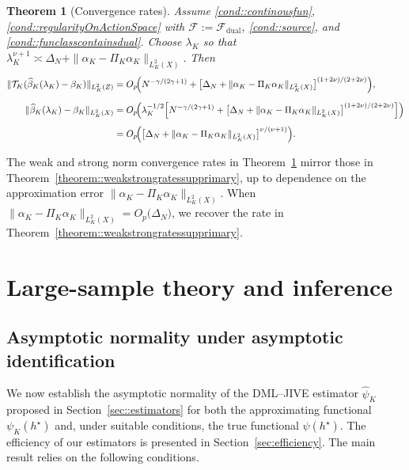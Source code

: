 \documentclass[11pt]{article}
\theoremstyle{plain}
\newtheorem{theorem}{Theorem}
\theoremstyle{definition}
\theoremstyle{remark}
\theoremstyle{definition}
\begin{document}
\begin{theorem}[Convergence rates]
\label{theorem::weakstrongratessup}
Assume \ref{cond::continousfun},  
\ref{cond::regularityOnActionSpace} with \(\mathcal{F} := \mathcal{F}_{\mathrm{dual}}\),  
\ref{cond::source}, and \ref{cond::funclasscontainsdual}.  
Choose \(\lambda_K\) so that $\lambda_K^{\nu+1} \asymp \Delta_N + \|\alpha_K - \Pi_K \alpha_K\|_{L^2_K(X)}.$
Then
\begin{align*}
\|\mathcal{T}_K(\widehat{\beta}_K(\lambda_K) - \beta_K)\|_{L^2_K(Z)}
&= O_p\!\Bigl(
N^{-\gamma/(2\gamma+1)}
+
\bigl[\Delta_N + \|\alpha_K - \Pi_K \alpha_K\|_{L^2_K(X)}\bigr]^{(1+2\nu)/(2+2\nu)}
\Bigr),\\[0.6em]
\|\widehat{\beta}_K(\lambda_K) - \beta_K\|_{L^2_K(X)}
&= O_p\!\Bigl(
\lambda_K^{-1/2}\Bigl[
N^{-\gamma/(2\gamma+1)}
+
\bigl[\Delta_N + \|\alpha_K - \Pi_K \alpha_K\|_{L^2_K(X)}\bigr]^{(1+2\nu)/(2+2\nu)}
\Bigr]\Bigr)\\[0.4em]
&= O_p\!\Bigl(
\bigl[\Delta_N + \|\alpha_K - \Pi_K \alpha_K\|_{L^2_K(X)}\bigr]^{\nu/(\nu+1)}
\Bigr).
\end{align*}
\end{theorem}


 
The weak and strong norm convergence rates in Theorem~\ref{theorem::weakstrongratessup} mirror those in Theorem~\ref{theorem::weakstrongratessupprimary}, up to dependence on the approximation error \(\|\alpha_K - \Pi_K \alpha_K\|_{L^2_K(X)}\). When \(\|\alpha_K - \Pi_K \alpha_K\|_{L^2_K(X)} = O_p\big(\Delta_N)\), we recover the rate in Theorem~\ref{theorem::weakstrongratessupprimary}.  


 
 
 


\section{Large-sample theory and inference}

\label{sec::theory}

 

 


 
\subsection{Asymptotic normality under asymptotic identification}

\label{sec::theory1}

We now establish the asymptotic normality of the DML--JIVE estimator
\( \widehat{\psi}_K \) proposed in Section~\ref{sec::estimators} for both the
approximating functional \( \psi_K(h^\star) \) and, under suitable conditions,
the true functional \( \psi(h^\star) \). The efficiency of our estimators is
presented in Section~\ref{sec:efficiency}. The main result relies on the
following conditions.
\end{document}
